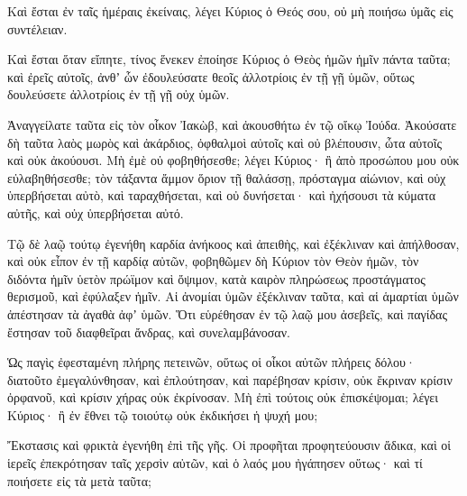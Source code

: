 {Καὶ ἔσται ἐν ταῖς ἡμέραις ἐκείναις, λέγει Κύριος ὁ Θεός σου, οὐ μὴ ποιήσω ὑμᾶς εἰς συντέλειαν.
\par }{\PP {}Καὶ ἔσται ὅταν εἴπητε, τίνος ἕνεκεν ἐποίησε Κύριος ὁ Θεὸς ἡμῶν ἡμῖν πάντα ταῦτα; καὶ ἐρεῖς αὐτοῖς, ἀνθʼ ὧν ἐδουλεύσατε θεοῖς ἀλλοτρίοις ἐν τῇ γῇ ὑμῶν, οὕτως δουλεύσετε ἀλλοτρίοις ἐν τῇ γῇ οὐχ ὑμῶν.
\par }{\PP {}Ἀναγγείλατε ταῦτα εἰς τὸν οἶκον Ἰακὼβ, καὶ ἀκουσθήτω ἐν τῷ οἴκῳ Ἰούδα.
Ἀκούσατε δὴ ταῦτα λαὸς μωρὸς καὶ ἀκάρδιος, ὀφθαλμοὶ αὐτοῖς καὶ οὐ βλέπουσιν, ὦτα αὐτοῖς καὶ οὐκ ἀκούουσι.
Μὴ ἐμὲ οὐ φοβηθήσεσθε; λέγει Κύριος· ἢ ἀπὸ προσώπου μου οὐκ εὐλαβηθήσεσθε; τὸν τάξαντα ἄμμον ὅριον τῇ θαλάσσῃ, πρόσταγμα αἰώνιον, καὶ οὐχ ὑπερβήσεται αὐτὸ, καὶ ταραχθήσεται, καὶ οὐ δυνήσεται· καὶ ἠχήσουσι τὰ κύματα αὐτῆς, καὶ οὐχ ὑπερβήσεται αὐτό.
\par }{\PP {}Τῷ δὲ λαῷ τούτῳ ἐγενήθη καρδία ἀνήκοος καὶ ἀπειθὴς, καὶ ἐξέκλιναν καὶ ἀπήλθοσαν,
καὶ οὐκ εἶπον ἐν τῇ καρδίᾳ αὐτῶν, φοβηθῶμεν δὴ Κύριον τὸν Θεὸν ἡμῶν, τὸν διδόντα ἡμῖν ὑετὸν πρώϊμον καὶ ὄψιμον, κατὰ καιρὸν πληρώσεως προστάγματος θερισμοῦ, καὶ ἐφύλαξεν ἡμῖν.
Αἱ ἀνομίαι ὑμῶν ἐξέκλιναν ταῦτα, καὶ αἱ ἁμαρτίαι ὑμῶν ἀπέστησαν τὰ ἀγαθὰ ἀφʼ ὑμῶν.
Ὅτι εὑρέθησαν ἐν τῷ λαῷ μου ἀσεβεῖς, καὶ παγίδας ἔστησαν τοῦ διαφθεῖραι ἄνδρας, καὶ συνελαμβάνοσαν.
\par }{\PP {}Ὡς παγὶς ἐφεσταμένη πλήρης πετεινῶν, οὕτως οἱ οἶκοι αὐτῶν πλήρεις δόλου· διατοῦτο ἐμεγαλύνθησαν, καὶ ἐπλούτησαν,
καὶ παρέβησαν κρίσιν, οὐκ ἔκριναν κρίσιν ὀρφανοῦ, καὶ κρίσιν χήρας οὐκ ἐκρίνοσαν.
Μὴ ἐπὶ τούτοις οὐκ ἐπισκέψομαι; λέγει Κύριος· ἢ ἐν ἔθνει τῷ τοιούτῳ οὐκ ἐκδικήσει ἡ ψυχή μου;
\par }{\PP {}Ἔκστασις καὶ φρικτὰ ἐγενήθη ἐπὶ τῆς γῆς.
Οἱ προφῆται προφητεύουσιν ἄδικα, καὶ οἱ ἱερεῖς ἐπεκρότησαν ταῖς χερσὶν αὐτῶν, καὶ ὁ λαός μου ἠγάπησεν οὕτως· καὶ τί ποιήσετε εἰς τὰ μετὰ ταῦτα;

}
